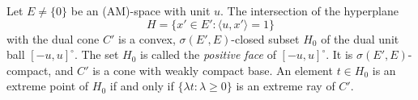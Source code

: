 Let $E \neq \{0\}$ be an (AM)-space with unit $u$. The intersection of the hyperplane
$$
H = \{x' \in E' : \langle u, x' \rangle = 1\}
$$
with the dual cone $C'$ is a convex, $\sigma(E', E)$-closed subset $H_0$ of the dual unit ball $[-u, u]^\circ$. The set $H_0$ is called the \emph{positive face} of $[-u, u]^\circ$. It is $\sigma(E', E)$-compact, and $C'$ is a cone with weakly compact base. An element $t \in H_0$ is an extreme point of $H_0$ if and only if $\{\lambda t : \lambda \geq 0\}$ is an extreme ray of $C'$.

